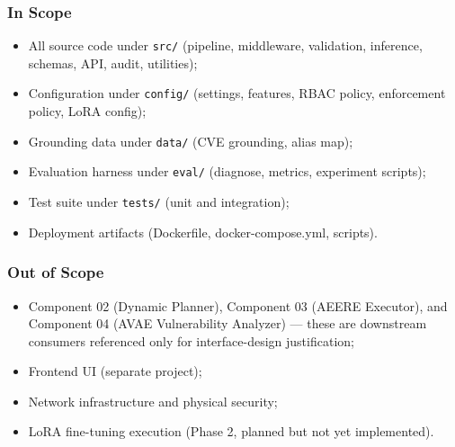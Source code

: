 ﻿\documentclass[10pt,journal,onecolumn]{IEEEtran}
\begin{document}
\subsubsection{In Scope}
\begin{itemize}
\item All source code under \texttt{src/} (pipeline, middleware, validation, inference, schemas, API, audit, utilities);
\item Configuration under \texttt{config/} (settings, features, RBAC policy, enforcement policy, LoRA config);
\item Grounding data under \texttt{data/} (CVE grounding, alias map);
\item Evaluation harness under \texttt{eval/} (diagnose, metrics, experiment scripts);
\item Test suite under \texttt{tests/} (unit and integration);
\item Deployment artifacts (Dockerfile, docker-compose.yml, scripts).
\end{itemize}

\subsubsection{Out of Scope}
\begin{itemize}
\item Component 02 (Dynamic Planner), Component 03 (AEERE Executor), and Component 04 (AVAE Vulnerability Analyzer) --- these are downstream consumers referenced only for interface-design justification;
\item Frontend UI (separate project);
\item Network infrastructure and physical security;
\item LoRA fine-tuning execution (Phase 2, planned but not yet implemented).
\end{itemize}
\end{document}
